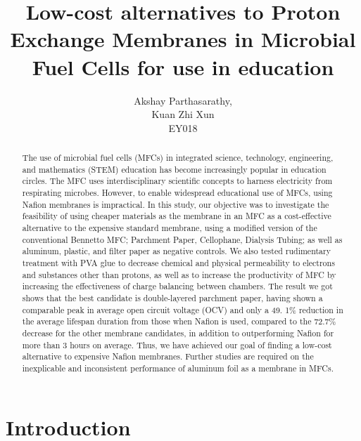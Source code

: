 \documentclass[12pt, twocolumn, a4paper]{article}
\title{\textbf{%
Low-cost alternatives to Proton Exchange Membranes in Microbial Fuel Cells for use in education}}
\author{Akshay Parthasarathy, \\ Kuan Zhi Xun \\ EY018
}
\date{}
\begin{document}
\maketitle
\begin{abstract}
    The use of microbial fuel cells (MFCs) in integrated science, technology, engineering, and mathematics (STEM) education has become increasingly popular in education circles. The MFC uses interdisciplinary scientific concepts to harness electricity from respirating microbes. However, to enable widespread educational use of MFCs, using Nafion\texttrademark{} membranes is impractical. In this study, our objective was to investigate the feasibility of using cheaper materials as the membrane in an MFC as a cost-effective alternative to the expensive standard membrane, using a modified version of the conventional Bennetto MFC; Parchment Paper, Cellophane, Dialysis Tubing; as well as aluminum, plastic, and filter paper as negative controls. We also tested rudimentary treatment with PVA glue to decrease chemical and physical permeability to electrons and substances other than protons, as well as to increase the productivity of MFC by increasing the effectiveness of charge balancing between chambers. The result we got shows that the best candidate is double-layered parchment paper, having shown a comparable peak in average open circuit voltage (OCV) and only a 49. 1\% reduction in the average lifespan duration from those when Nafion\texttrademark{} is used, compared to the 72.7\% decrease for the other membrane candidates, in addition to outperforming Nafion\texttrademark{} for more than 3 hours on average. Thus, we have achieved our goal of finding a low-cost alternative to expensive Nafion\texttrademark{} membranes. Further studies are required on the inexplicable and inconsistent performance of aluminum foil as a membrane in MFCs.
\end{abstract}
\section{Introduction}
\end{document}
